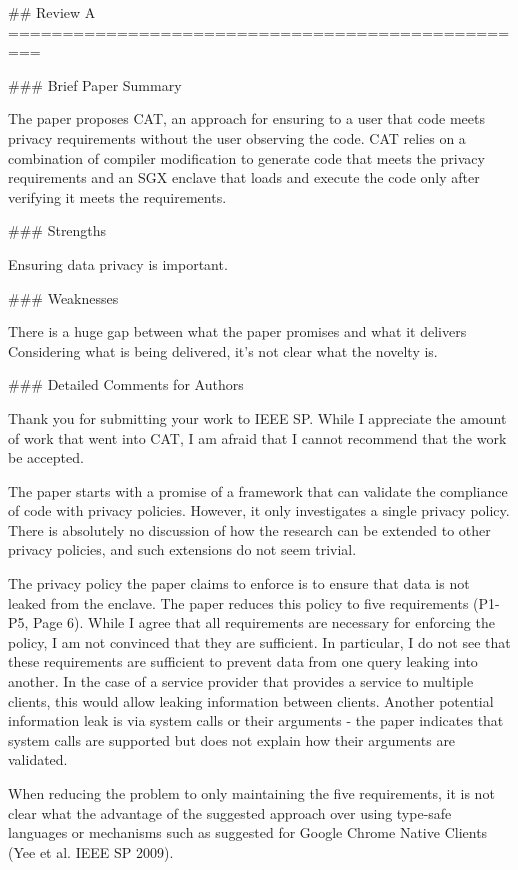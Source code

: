 \begin{markdown}
## Review A
=================================================


### Brief Paper Summary  

The paper proposes CAT, an approach for ensuring to a user that code meets privacy requirements without the user observing the code.  CAT relies on a combination of compiler modification to generate code that meets the privacy requirements and an SGX enclave that loads and execute the code only after verifying it meets the requirements.

### Strengths

Ensuring data privacy is important.

### Weaknesses

There is a huge gap between what the paper promises and what it delivers
Considering what is being delivered, it's not clear what the novelty is.

### Detailed Comments for Authors

Thank you for submitting your work to IEEE SP.  While I appreciate the amount of work that went into CAT, I am afraid that I cannot recommend that the work be accepted.

The paper starts with a promise of a framework that can validate the compliance of code with privacy policies. However, it only investigates a single privacy policy. There is absolutely no discussion of how the research can be extended to other privacy policies, and such extensions do not seem trivial.

The privacy policy the paper claims to enforce is to ensure that data is not leaked from the enclave.  The paper reduces this policy to five requirements (P1-P5, Page 6).  While I agree that all requirements are necessary for enforcing the policy, I am not convinced that they are sufficient.  In particular, I do not see that these requirements are sufficient to prevent data from one query leaking into another.  In the case of a service provider that provides a service to multiple clients, this would allow leaking information between clients.  Another potential information leak is via system calls or their arguments - the paper indicates that system calls are supported but does not explain how their arguments are validated.

When reducing the problem to only maintaining the five requirements, it is not clear what the advantage of the suggested approach over using type-safe languages or mechanisms such as suggested for Google Chrome Native Clients (Yee et al. IEEE SP 2009).


\end{markdown}
